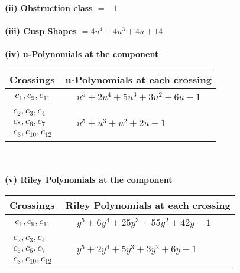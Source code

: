 \documentclass[1p]{elsarticle_modified}
\theoremstyle{definition}
\begin{document}
\flushleft \textbf{(ii) Obstruction class $= -1$}\\~\\
\flushleft \textbf{(iii) Cusp Shapes $= 4 u^4+4 u^3+4 u+14$}\\~\\
\newpage\renewcommand{\arraystretch}{1}
\flushleft \textbf{(iv) u-Polynomials at the component}\newline \\
\begin{tabular}{m{50pt}|m{274pt}}
Crossings & \hspace{64pt}u-Polynomials at each crossing \\
\hline $$\begin{aligned}c_{1},c_{9},c_{11}\end{aligned}$$&$\begin{aligned}
&u^5+2 u^4+5 u^3+3 u^2+6 u-1
\end{aligned}$\\
\hline $$\begin{aligned}c_{2},c_{3},c_{4}\\c_{5},c_{6},c_{7}\\c_{8},c_{10},c_{12}\end{aligned}$$&$\begin{aligned}
&u^5+u^3+u^2+2 u-1
\end{aligned}$\\
\hline
\end{tabular}\\~\\
\newpage\renewcommand{\arraystretch}{1}
\flushleft \textbf{(v) Riley Polynomials at the component}\newline \\
\begin{tabular}{m{50pt}|m{274pt}}
Crossings & \hspace{64pt}Riley Polynomials at each crossing \\
\hline $$\begin{aligned}c_{1},c_{9},c_{11}\end{aligned}$$&$\begin{aligned}
&y^5+6 y^4+25 y^3+55 y^2+42 y-1
\end{aligned}$\\
\hline $$\begin{aligned}c_{2},c_{3},c_{4}\\c_{5},c_{6},c_{7}\\c_{8},c_{10},c_{12}\end{aligned}$$&$\begin{aligned}
&y^5+2 y^4+5 y^3+3 y^2+6 y-1
\end{aligned}$\\
\hline
\end{tabular}\\~\\
\end{document}
